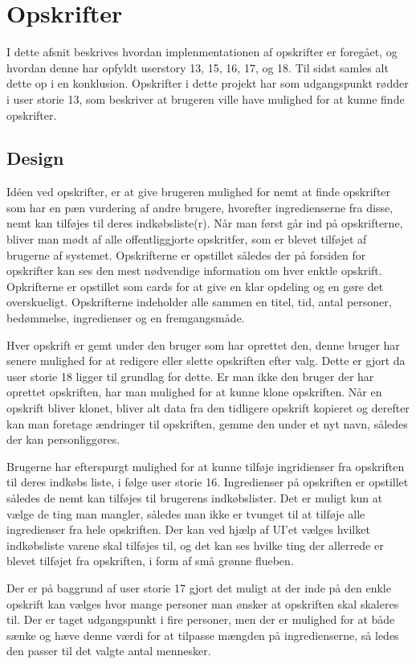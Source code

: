 \section{Opskrifter}
I dette afsnit beskrives hvordan implenmentationen af opskrifter er foregået, og hvordan denne har opfyldt userstory 13, 15, 16, 17, og 18. Til sidst samles alt dette op i en konklusion. Opskrifter i dette projekt har som udgangspunkt rødder i user storie 13, som beskriver at brugeren ville have mulighed for at kunne finde opskrifter.
\subsection{Design}
Idéen ved opskrifter, er at give brugeren mulighed for nemt at finde opskrifter som har en pæn vurdering af andre brugere, hvorefter ingredienserne fra disse, nemt kan tilføjes til deres indkøbsliste(r).
Når man først går ind på opskrifterne, bliver man mødt af alle offentliggjorte opskritfer, som er blevet tilføjet af brugerne af systemet.
Opskrifterne er opstillet således der på forsiden for opskrifter kan ses den mest nødvendige information om hver enktle opskrift.
Opkrifterne er opstillet som cards for at give en klar opdeling og en gøre det overskueligt.
Opskrifterne indeholder alle sammen en titel, tid, antal personer, bedømmelse, ingredienser og en fremgangsmåde.


Hver opskrift er gemt under den bruger som har oprettet den, denne bruger har senere mulighed for at redigere eller slette opskriften efter valg.
Dette er gjort da user storie 18 ligger til grundlag for dette.
Er man ikke den bruger der har oprettet opskriften, har man mulighed for at kunne klone opskriften.
Når en opskrift bliver klonet, bliver alt data fra den tidligere opskrift kopieret og derefter kan man foretage ændringer til opskriften, gemme den under et nyt navn, således der kan personliggøres.


Brugerne har efterspurgt mulighed for at kunne tilføje ingridienser fra opskriften til deres indkøbs liste, i følge user storie 16.
Ingredienser på opskriften er opstillet således de nemt kan tilføjes til brugerens indkøbslister.
Det er muligt kun at vælge de ting man mangler, således man ikke er tvunget til at tilføje alle ingredienser fra hele opskriften.
Der kan ved hjælp af UI'et vælges hvilket indkøbsliste varene skal tilføjes til, og det kan ses hvilke ting der allerrede er blevet tilføjet fra opskriften, i form af små grønne flueben.


Der er på baggrund af user storie 17 gjort det muligt at der inde på den enkle opskrift kan vælges hvor mange personer man ønsker at opskriften skal skaleres til.
Der er taget udgangspunkt i fire personer, men der er mulighed for at både sænke og hæve denne værdi for at tilpasse mængden på ingredienserne, så ledes den passer til det valgte antal mennesker.



